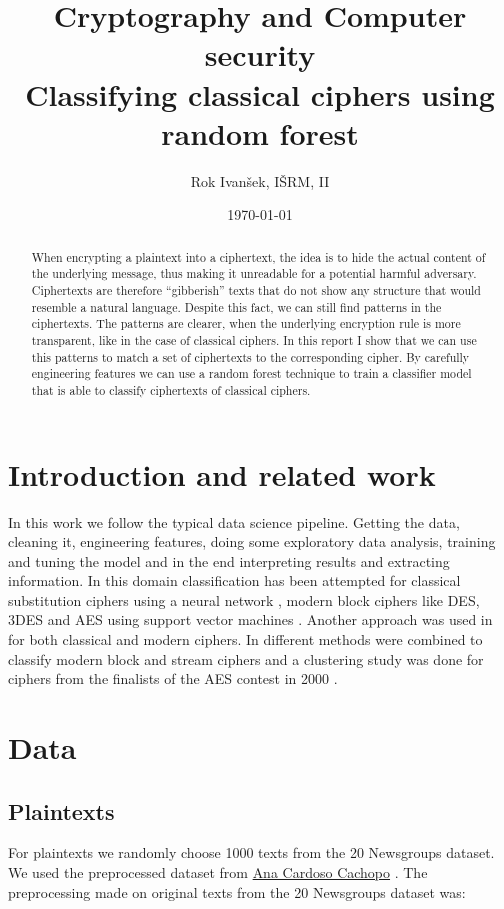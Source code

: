 \documentclass[a4paper]{article}
\title{Cryptography and Computer security\\
Classifying classical ciphers using random forest}
\author{Rok Ivanšek, IŠRM, II}
\date{\today}
\begin{document}
\maketitle


\begin{abstract}
When encrypting a plaintext into a ciphertext, the idea is to hide the actual content of the underlying message, thus making it unreadable for a potential harmful adversary. Ciphertexts are therefore ``gibberish'' texts that do not show any structure that would resemble a natural language. Despite this fact, we can still find patterns in the ciphertexts. The patterns are clearer, when the underlying encryption rule is more transparent, like in the case of classical ciphers. In this report I show that we can use this patterns to match a set of ciphertexts to the corresponding cipher. By carefully engineering features we can use a random forest technique to train a classifier model that is able to classify ciphertexts of classical ciphers.
\end{abstract}

\section{Introduction and related work}
In this work we follow the typical data science pipeline. Getting the data, cleaning it, engineering features, doing some exploratory data analysis, training and tuning the model and in the end interpreting results and extracting information. In this domain classification has been attempted for classical substitution ciphers using a neural network \cite{sivagurunathan2010classification}, modern block ciphers like DES, 3DES and AES using support vector machines \cite{dileep2006identification}. Another approach was used in \cite{maheshwari2001classification} for both classical and modern ciphers. In \cite{mishra2013pattern} different methods were combined to classify modern block and stream ciphers and a clustering study was done for ciphers from the finalists of the AES contest in 2000 \cite{decipher}.

\section{Data}

\subsection{Plaintexts}
For plaintexts we randomly choose 1000 texts from the 20 Newsgroups dataset. We used the preprocessed dataset from \href{http://ana.cachopo.org/datasets-for-single-label-text-categorization}{Ana Cardoso Cachopo} \cite{2007:phd-Ana-Cardoso-Cachopo}. The preprocessing made on original texts from the 20 Newsgroups dataset was:
\end{document}
